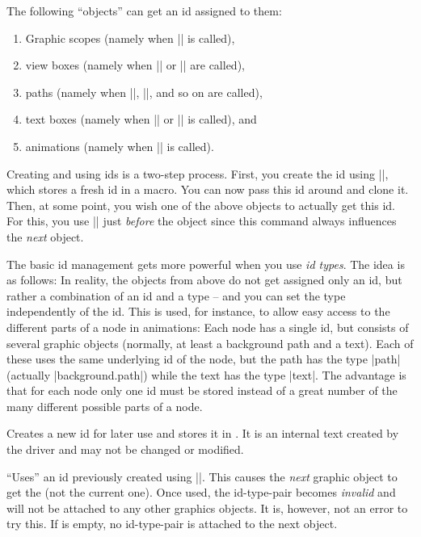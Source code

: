 The following ``objects'' can get an id assigned to them:
\begin{enumerate}
\item Graphic scopes (namely when |\pgfsys@begin@idscope| is called),
\item view boxes (namely when |\pgfsys@viewboxmeet| or |\pgfsys@viewboxslice| are called),
\item paths (namely when |\pgfsys@fill|, |\pgfsys@stroke|, and so on are called),
\item text boxes (namely when |\pgfsys@hbox| or |\pgfsys@hboxsynced| is called), and
\item animations (namely when |\pgfsys@animate| is called).
\end{enumerate}


Creating and using ids is a two-step process. First, you create the
id using |\pgfsys@new@id|, which stores a fresh id in a macro. You can
now pass this id around and clone it. Then, at some point, you wish
one of the above objects to actually get this id. For this, you use
|\pgfsys@use@id| just \emph{before} the object since this command
always influences the \emph{next} object.

The basic id management gets more powerful when you use \emph{id
  types}. The idea is as follows: In reality, the objects from above
do not get assigned only an id, but rather a combination of an id and
a type -- and you can set the type independently of the id. This is
used, for instance, to allow easy access to the different parts of a
node in animations: Each node has a single id, but consists of several
graphic objects (normally, at least a background path and a
text). Each of these uses the same underlying id of the node, but the
path has the type |path| (actually |background.path|) while the text
has the type |text|. The advantage is that for each node only one id
must be stored instead of a great number of the many different
possible parts of a node.

\begin{command}{\pgfsys@new@id{}}
  Creates a new id for later use and stores it in . It is
  an internal text created by the driver and may not be changed or
  modified. 
\end{command}

\begin{command}{\pgfsys@use@id{}}
  ``Uses'' an id previously created using |\pgfsys@new@id|. This
  causes the \emph{next} graphic object to get the  (not the
  current one). Once used, the id-type-pair becomes \emph{invalid} and
  will not be attached to any other graphics objects. It is, however,
  not an error to try this. If  is empty, no id-type-pair is
  attached to the next object.
\end{command}

